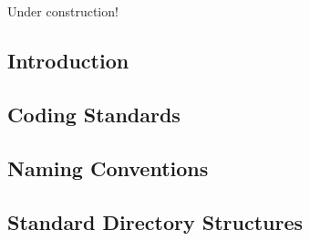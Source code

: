 
\chapter{\cmpdzerolongtitle{}}

\label{cmpd0}

                     {Under construction!}


\section{Introduction}


\section{Coding Standards}


\section{Naming Conventions}


\section{Standard Directory Structures}


